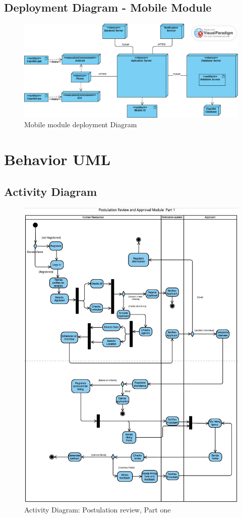 \documentclass{scrreprt}
\begin{document}
\section{Deployment Diagram - Mobile Module}
\begin{figure}[H]
	\centering  \small
	\includegraphics[width=\textwidth]{DPL/DPL2.jpeg} 
	\caption{Mobile module deployment Diagram}
	\label{fig:DPL2}
\end{figure}
\chapter{Behavior UML}

\section{Activity Diagram}
\begin{figure}[H]
	\centering
	\includegraphics[width=\textwidth]{AD/AD1.png}
	\caption{Activity Diagram: Postulation review, Part one}
	\label{fig:AD1}
\end{figure}
\end{document}
